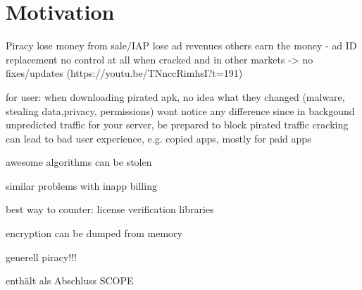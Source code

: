 \section{Motivation}\label{section:introduction-motivation}
Piracy\newline
lose money from sale/IAP\newline
lose ad revenues\newline
others earn the money  - ad ID replacement\newline
no control at all when cracked and in other markets -> no fixes/updates (https://youtu.be/TNnccRimhsI?t=191)\newline

for user: when downloading pirated apk, no idea what they changed (malware, stealing data,privacy, permissions)\newline
wont notice any difference since in backgound\newline
unpredicted traffic for your server, be prepared to block pirated traffic\newline
cracking can lead to bad user experience, e.g. copied apps, mostly for paid apps\newline

awesome algorithms can be stolen\newline

similar problems with inapp billing\newline

best way to counter: license verification libraries\newline

encryption can be dumped from memory\newline

generell piracy!!!\newline

enthält als Abschluss SCOPE\newline
